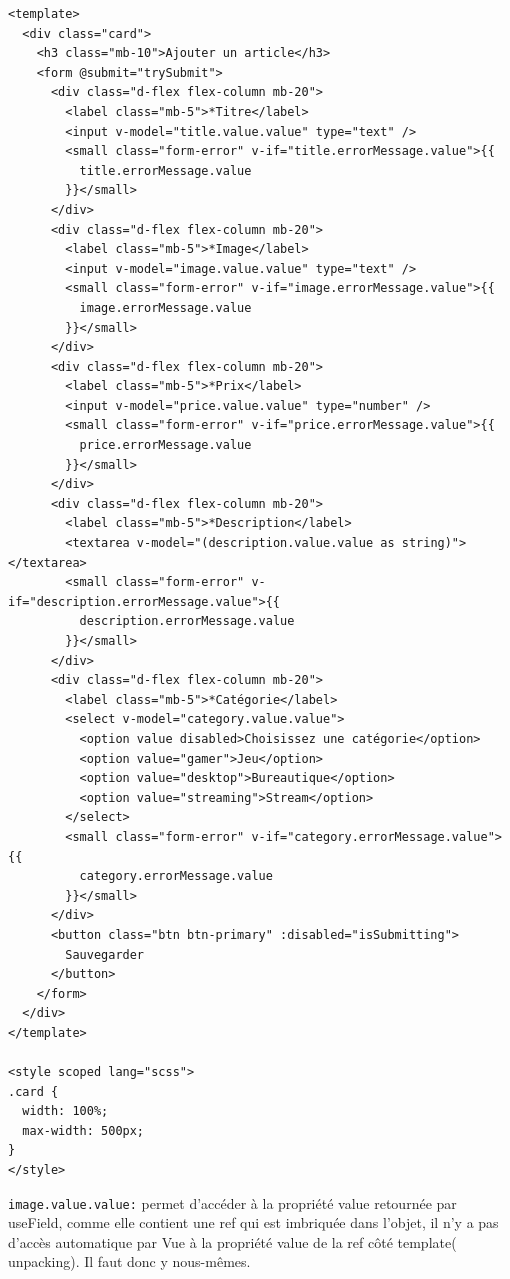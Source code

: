 \begin{verbatim}
<template>
  <div class="card">
    <h3 class="mb-10">Ajouter un article</h3>
    <form @submit="trySubmit">
      <div class="d-flex flex-column mb-20">
        <label class="mb-5">*Titre</label>
        <input v-model="title.value.value" type="text" />
        <small class="form-error" v-if="title.errorMessage.value">{{
          title.errorMessage.value
        }}</small>
      </div>
      <div class="d-flex flex-column mb-20">
        <label class="mb-5">*Image</label>
        <input v-model="image.value.value" type="text" />
        <small class="form-error" v-if="image.errorMessage.value">{{
          image.errorMessage.value
        }}</small>
      </div>
      <div class="d-flex flex-column mb-20">
        <label class="mb-5">*Prix</label>
        <input v-model="price.value.value" type="number" />
        <small class="form-error" v-if="price.errorMessage.value">{{
          price.errorMessage.value
        }}</small>
      </div>
      <div class="d-flex flex-column mb-20">
        <label class="mb-5">*Description</label>
        <textarea v-model="(description.value.value as string)"></textarea>
        <small class="form-error" v-if="description.errorMessage.value">{{
          description.errorMessage.value
        }}</small>
      </div>
      <div class="d-flex flex-column mb-20">
        <label class="mb-5">*Catégorie</label>
        <select v-model="category.value.value">
          <option value disabled>Choisissez une catégorie</option>
          <option value="gamer">Jeu</option>
          <option value="desktop">Bureautique</option>
          <option value="streaming">Stream</option>
        </select>
        <small class="form-error" v-if="category.errorMessage.value">{{
          category.errorMessage.value
        }}</small>
      </div>
      <button class="btn btn-primary" :disabled="isSubmitting">
        Sauvegarder
      </button>
    </form>
  </div>
</template>

<style scoped lang="scss">
.card {
  width: 100%;
  max-width: 500px;
}
</style>
\end{verbatim}
{\tt image.value.value:} permet d'accéder à la propriété {\color{monOrange}value} retournée par {\color{monOrange}useField}, comme elle contient une {\color{monOrange}ref} qui est imbriquée dans l'objet, il n'y a pas d'accès automatique par {\color{monOrange}Vue} à la propriété {\color{monOrange}value} de la {\color{monOrange}ref} côté {\color{monOrange}template}( {\color{monOrange}unpacking}). Il faut donc y nous-mêmes.



